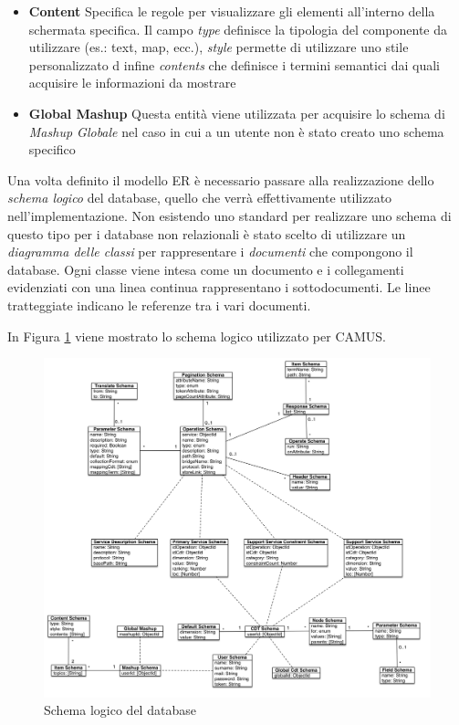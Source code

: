 \begin{itemize}
	\item \textbf{Content} Specifica le regole per visualizzare gli elementi all'interno della schermata specifica. Il campo \emph{type} definisce la tipologia del componente da utilizzare (es.: text, map, ecc.), \emph{style} permette di utilizzare uno stile personalizzato d infine \emph{contents} che definisce i termini semantici dai quali acquisire le informazioni da mostrare
	\item \textbf{Global Mashup} Questa entità viene utilizzata per acquisire lo schema di \emph{Mashup Globale} nel caso in cui a un utente non è stato creato uno schema specifico
\end{itemize}

Una volta definito il modello ER è necessario passare alla realizzazione dello \emph{schema logico} del database, quello che verrà effettivamente utilizzato nell'implementazione. Non esistendo uno standard per realizzare uno schema di questo tipo per i database non relazionali è stato scelto di utilizzare un \emph{diagramma delle classi} per rappresentare i \emph{documenti} che compongono il database. Ogni classe viene intesa come un documento e i collegamenti evidenziati con una linea continua rappresentano i sottodocumenti. Le linee tratteggiate indicano le referenze tra i vari documenti.

In Figura \ref{fig:schema-logico-db} viene mostrato lo schema logico utilizzato per CAMUS.

\begin{figure}[ht]
	\centering
	\includegraphics[width=\textwidth]{5-implementazione-backend/Immagini/schema_logico_db.png}
	\caption{Schema logico del database}\label{fig:schema-logico-db}
\end{figure}

